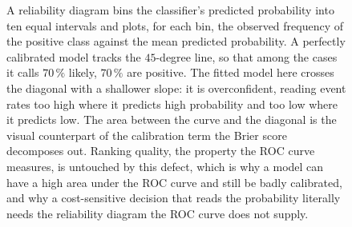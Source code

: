 \begin{figure}[htbp]
\centering
{}
\caption[Reliability diagram for a probabilistic classifier]{A reliability
diagram bins the classifier's predicted probability into ten equal
intervals and plots, for each bin, the observed frequency of the positive
class against the mean predicted probability. A perfectly calibrated model
tracks the $45$-degree line, so that among the cases it calls $70\,\%$
likely, $70\,\%$ are positive. The fitted model here crosses the diagonal
with a shallower slope: it is overconfident, reading event rates too high
where it predicts high probability and too low where it predicts low. The
area between the curve and the diagonal is the visual counterpart of the
calibration term the Brier score decomposes out. Ranking quality, the
property the ROC curve measures, is untouched by this defect, which is why
a model can have a high area under the ROC curve and still be badly
calibrated, and why a cost-sensitive decision that reads the probability
literally needs the reliability diagram the ROC curve does not supply.}
\label{fig:vol02ch14:calibration}
\end{figure}

